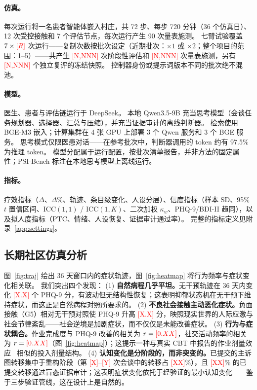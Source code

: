 \documentclass[11pt,a4paper]{article}
\newcommand{\ph}[1]{\textcolor{red}{[#1]}}
\begin{document}
\paragraph{仿真。}
每次运行将一名患者智能体嵌入村庄，共 72 步、每步 720 分钟（36 个仿真日）、12 次受控接触和 7 个评估节点，每次运行产生 90 次量表施测。
七臂试验覆盖 $7 \times \ph{R}$ 次运行——复制次数按批次设定（近期批次：$\times 1$ 或 $\times 2$；整个项目的范围：1--5）——共产生 \ph{N,NNN} 次阶段性评估和 \ph{N,NNN} 次量表施测，另有 \ph{N,NNN} 个独立复评的冻结快照。
控制器身份或提示词版本不同的批次绝不混池。

\paragraph{模型。}
医生、患者与评估链运行于 DeepSeek。
本地 Qwen3.5-9B 充当思考模型（会谈任务规划器、选择器、汇总与压缩），并充当证据审计的离线判断器。
检索使用 BGE-M3 嵌入；计算集群在 4 张 GPU 上部署 3 个 Qwen 服务和 3 个 BGE 服务。
思考模式仅限医患对话——在参考批次中，判断器调用的 token 约有 97.5\% 为推理 token。
模型分配属于运行配置，按批次清单报告，并非方法的固定属性；PSI-Bench 标注在本地思考模型上离线运行。

\paragraph{指标。}
疗效指标（$\Delta$、$\Delta\%$、轨迹、条目级变化、人设分层）、信度指标（样本 SD、95\% $t$ 置信区间、ICC$(1,1)$ / ICC$(1,K)$、二次加权 $\kappa_w$、PHQ-9/BDI-II 趋同），以及拟人度指标（PTC、情绪、人设恢复、证据审计通过率）。
完整的指标定义见附录~\ref{app:settings}。

\subsection{长期社区仿真分析}\label{sec:simanalysis}

图~\ref{fig:traj} 绘出 36 天窗口内的症状轨迹，图~\ref{fig:heatmap} 将行为频率与症状变化相关联。
我们突出四个发现：
(1) \textbf{自然病程几乎平坦。}无干预轨迹在 36 天内变化 \ph{X.X} 个 PHQ-9 分，有波动但无结构性恢复；这表明抑郁状态机在无干预下维持症状，而这正是自然病程对照所要求的。
(2) \textbf{不良社会接触主动恶化症状。}负面接触（G5）相对无干预对照使 PHQ-9 升高 \ph{X.X} 分，映照现实世界的人际应激与社会节律紊乱——社会逆境是加剧症状，而不仅仅是未能改善症状。
(3) \textbf{行为与症状耦合。}作业完成度与 PHQ-9 改善的相关为 $r = \ph{0.XX}$，社交活动频率的相关为 $r = \ph{0.XX}$（图~\ref{fig:heatmap}）；这提示一种与真实 CBT 中报告的作业剂量效应~\citep{burns2001} 相似的投入剂量结构。
(4) \textbf{认知变化是分阶段的，而非突变的。}已提交的主诉图转移集中于重构阶段（第 \ph{X}--\ph{Y} 次会谈中的转移占 \ph{XX}\%），且 \ph{XX}\% 的已提交转移通过盲态证据审计；这表明症状变化依托于经验证的最小认知变化——鉴于三步验证管线，这在设计上是自然的。
\end{document}
